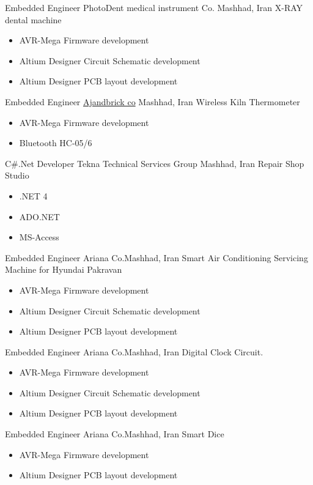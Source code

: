 	{Embedded Engineer}
	{PhotoDent medical instrument Co.}
        {Mashhad, Iran}
	{
         \newline
         X-RAY dental machine
         }
        {
        \begin{itemize}
            \item AVR-Mega Firmware development
            \item Altium Designer Circuit Schematic development
            \item Altium Designer  PCB layout development 
        \end{itemize}
        }
	{Embedded Engineer}
	{\href{http://ajandbrick.co/}{\color{blue}Ajandbrick co}}
        {Mashhad, Iran}
	{
         \newline
         Wireless Kiln Thermometer}
         {
         \begin{itemize}
             \item AVR-Mega Firmware development
             \item Bluetooth HC-05/6
         \end{itemize}
         }

	{C\#.Net Developer}
	{Tekna Technical Services Group}
        {Mashhad, Iran}
	{ \newline
         Repair Shop Studio
        }
        {
        \begin{itemize}
           \item .NET 4
           \item ADO.NET 
           \item MS-Access
        \end{itemize}
        }


	{Embedded Engineer}
	{Ariana Co.}{Mashhad, Iran}
	{
         \newline
        Smart Air Conditioning Servicing Machine for Hyundai Pakravan
        }
        {\begin{itemize}
            \item AVR-Mega Firmware development
            \item Altium Designer Circuit Schematic development
            \item Altium Designer  PCB layout development 
        \end{itemize}}


	{Embedded Engineer}
	{Ariana Co.}{Mashhad, Iran}
	{
        \newline 
        Digital Clock Circuit.
        }
        {
        \begin{itemize}
            \item AVR-Mega Firmware development
            \item Altium Designer Circuit Schematic development
            \item Altium Designer  PCB layout development 
        \end{itemize}
        }

	{Embedded Engineer}
	{Ariana Co.}{Mashhad, Iran}
	{
        \newline 
        Smart Dice
        }
        {
        \begin{itemize}
            \item AVR-Mega Firmware development
            \item Altium Designer  PCB layout development 
        \end{itemize}
        }


 
